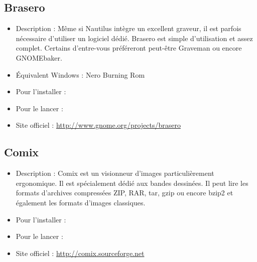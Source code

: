\subsection{Brasero}
\label{RefInstallBrasero}
\begin{itemize}
\begingroup
{}
\item Description : Même si Nautilus intègre un excellent graveur, il est parfois nécessaire d'utiliser un logiciel dédié. Brasero est simple d'utilisation et assez complet. Certains d'entre-vous préféreront peut-être Graveman ou encore GNOMEbaker.{\par}
\item Équivalent Windows : Nero Burning Rom{\par}
\item Pour l'installer : 
\item Pour le lancer : 
\item Site officiel : \url{http://www.gnome.org/projects/brasero}{\par}
\endgroup
\end{itemize}
\subsection{Comix}
\begin{itemize}
\begingroup
{}
\item Description : Comix est un visionneur d'images particulièrement ergonomique. Il est spécialement dédié aux bandes dessinées. Il peut lire les formats d'archives compressées ZIP, RAR, tar, gzip ou encore bzip2 et également les formats d'images classiques.{\par}
\item Pour l'installer : 
\item Pour le lancer : 
\item Site officiel : \url{http://comix.sourceforge.net}{\par}
\endgroup
\end{itemize}


